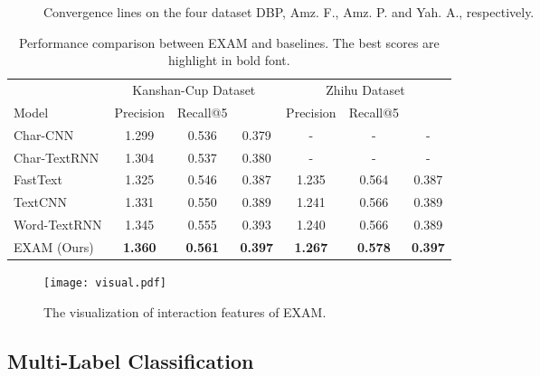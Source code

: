 \documentclass[letterpaper]{article} \usepackage{aaai19}  \usepackage{times}  \usepackage{helvet}  \usepackage{courier}  \usepackage{url}  \usepackage{graphicx}
\begin{document}
\begin{figure*}[!htb]

\centering
{}
\caption{Convergence lines on the four dataset DBP, Amz. F., Amz. P. and Yah. A., respectively.}
\label{loss}
\end{figure*}
\begin{table*}
  \caption{Performance comparison between EXAM and baselines. The best scores are highlight in bold font.}
  \label{table}
  \centering
  \begin{tabular}{lcccccc}
    \toprule
     & \multicolumn{3}{c}{Kanshan-Cup Dataset} & \multicolumn{3}{c}{Zhihu Dataset} \\
    \cmidrule(r){2-4} \cmidrule(r){5-7}
    Model     &Precision & Recall@5 &    &Precision & Recall@5 & \\
    \midrule
    Char-CNN \cite{charcnn} &1.299 & 0.536 &0.379  &- & - &-    \\
    Char-TextRNN \cite{TextRNN} &1.304 &0.537 &0.380  &- & - &-    \\
     \midrule
    FastText \cite{fasttext} &1.325 & 0.546 &0.387  &1.235 &0.564 &0.387 \\
    TextCNN \cite{TextCNN} &1.331 & 0.550 &0.389  &1.241 &0.566 &0.389    \\
    Word-TextRNN \cite{TextRNN} &1.345 & 0.555 &0.393  &1.240 &0.566  &0.389    \\
    EXAM (Ours) &\textbf{1.360} &\textbf{0.561} &\textbf{0.397} &\textbf{1.267}  &\textbf{0.578}  &\textbf{0.397}    \\
    \bottomrule
  \end{tabular}
\end{table*}
\begin{figure*}
\centering
\texttt{[image: visual.pdf]}
\caption{The visualization of interaction features of EXAM.}
\label{vis4text}
\end{figure*}
\subsection{Multi-Label Classification}
\end{document}
